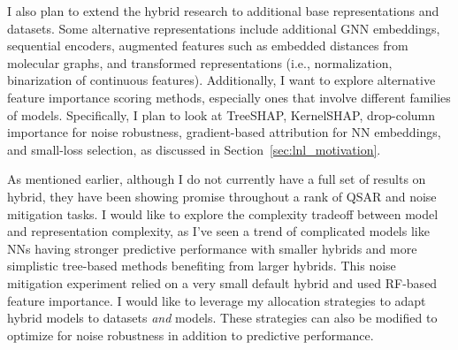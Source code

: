 
I also plan to extend the hybrid research to additional base representations and datasets. Some alternative representations include additional GNN embeddings, sequential encoders, augmented features such as embedded distances from molecular graphs, and transformed representations (i.e., normalization, binarization of continuous features). Additionally, I want to explore alternative feature importance scoring methods, especially ones that involve different families of models. Specifically, I plan to look at TreeSHAP, KernelSHAP, drop-column importance for noise robustness, gradient-based attribution for NN embeddings, and small-loss selection, as discussed in Section~\ref{sec:lnl_motivation}.

As mentioned earlier, although I do not currently have a full set of results on hybrid, they have been showing promise throughout a rank of QSAR and noise mitigation tasks. I would like to explore the complexity tradeoff between model and representation complexity, as I've seen a trend of complicated models like NNs having stronger predictive performance with smaller hybrids and more simplistic tree-based methods benefiting from larger hybrids. This noise mitigation experiment relied on a very small default hybrid and used RF-based feature importance. I would like to leverage my allocation strategies to adapt hybrid models to datasets \textit{and} models. These strategies can also be modified to optimize for noise robustness in addition to predictive performance.

